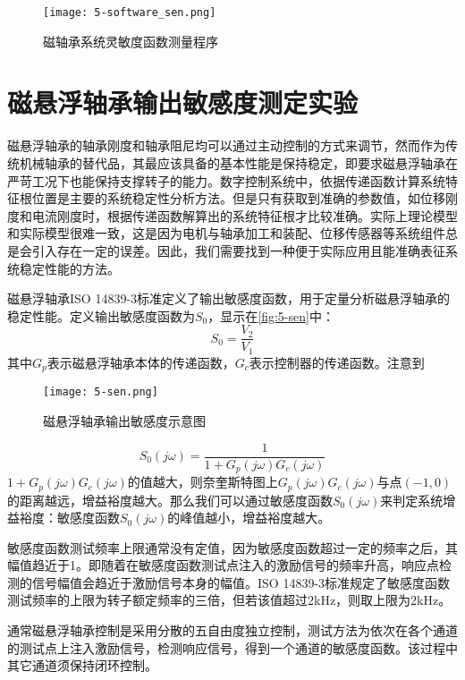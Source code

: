 \documentclass[
  lang=cn,
  degree=master,
  openany,oneside
]{nuaathesis}
\begin{document}
\begin{figure}[h!]
	\texttt{[image: 5-software\_sen.png]}
	\caption{磁轴承系统灵敏度函数测量程序}
	\label{fig:5-software_sen}
\end{figure}

\section{磁悬浮轴承输出敏感度测定实验}
磁悬浮轴承的轴承刚度和轴承阻尼均可以通过主动控制的方式来调节，然而作为传统机械轴承的替代品，其最应该具备的基本性能是保持稳定，即要求磁悬浮轴承在严苛工况下也能保持支撑转子的能力。数字控制系统中，依据传递函数计算系统特征根位置是主要的系统稳定性分析方法。但是只有获取到准确的参数值，如位移刚度和电流刚度时，根据传递函数解算出的系统特征根才比较准确。实际上理论模型和实际模型很难一致，这是因为电机与轴承加工和装配、位移传感器等系统组件总是会引入存在一定的误差。因此，我们需要找到一种便于实际应用且能准确表征系统稳定性能的方法。

磁悬浮轴承ISO 14839-3标准\cite{iso2004mechanical}定义了输出敏感度函数，用于定量分析磁悬浮轴承的稳定性能。定义输出敏感度函数为$S_0$，显示在\autoref{fig:5-sen}中：
\begin{equation}
	S_0 = \frac{V_2}{V_1}
\end{equation}
其中$G_p$表示磁悬浮轴承本体的传递函数，$G_c$表示控制器的传递函数。注意到
\begin{figure}[h!]
	\texttt{[image: 5-sen.png]}
	\caption{磁悬浮轴承输出敏感度示意图}
	\label{fig:5-sen}
\end{figure}

\begin{equation}
	S_0(j\omega) = \frac{1}{1 + G_p(j\omega)G_c(j\omega)}
\end{equation}
$1 + G_p(j\omega)G_c(j\omega)$的值越大，则奈奎斯特图上$G_p(j\omega)G_c(j\omega)$与点$(-1,0)$的距离越远，增益裕度越大。那么我们可以通过敏感度函数$S_0(j\omega)$来判定系统增益裕度：敏感度函数$S_0(j\omega)$的峰值越小，增益裕度越大。

敏感度函数测试频率上限通常没有定值，因为敏感度函数超过一定的频率之后，其幅值趋近于1。即随着在敏感度函数测试点注入的激励信号的频率升高，响应点检测的信号幅值会趋近于激励信号本身的幅值。ISO 14839-3标准规定了敏感度函数测试频率的上限为转子额定频率的三倍，但若该值超过2kHz，则取上限为2kHz。

通常磁悬浮轴承控制是采用分散的五自由度独立控制，测试方法为依次在各个通道的测试点上注入激励信号，检测响应信号，得到一个通道的敏感度函数。该过程中其它通道须保持闭环控制。
\end{document}
